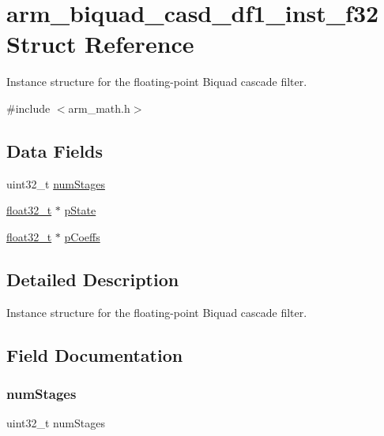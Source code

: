 \hypertarget{structarm__biquad__casd__df1__inst__f32}{}\section{arm\+\_\+biquad\+\_\+casd\+\_\+df1\+\_\+inst\+\_\+f32 Struct Reference}
\label{structarm__biquad__casd__df1__inst__f32}


Instance structure for the floating-\/point Biquad cascade filter.  




{\ttfamily \#include $<$arm\+\_\+math.\+h$>$}

\subsection*{Data Fields}
\begin{DoxyCompactItemize}
\item 
uint32\+\_\+t \mbox{\hyperlink{structarm__biquad__casd__df1__inst__f32_aed9c8a6224cd149e8e12b17b25b9b767}{num\+Stages}}
\item 
\mbox{\hyperlink{arm__math_8h_a4611b605e45ab401f02cab15c5e38715}{float32\+\_\+t}} $\ast$ \mbox{\hyperlink{structarm__biquad__casd__df1__inst__f32_a335c87e6fdc4b96601d95a5de8b9c463}{p\+State}}
\item 
\mbox{\hyperlink{arm__math_8h_a4611b605e45ab401f02cab15c5e38715}{float32\+\_\+t}} $\ast$ \mbox{\hyperlink{structarm__biquad__casd__df1__inst__f32_aacbb8dd8eeba4b21fc2bb40076405ee3}{p\+Coeffs}}
\end{DoxyCompactItemize}


\subsection{Detailed Description}
Instance structure for the floating-\/point Biquad cascade filter. 

\subsection{Field Documentation}
\mbox{\label{structarm__biquad__casd__df1__inst__f32_aed9c8a6224cd149e8e12b17b25b9b767}} 
\subsubsection{\texorpdfstring{numStages}{numStages}}
{\footnotesize\ttfamily uint32\+\_\+t num\+Stages}

